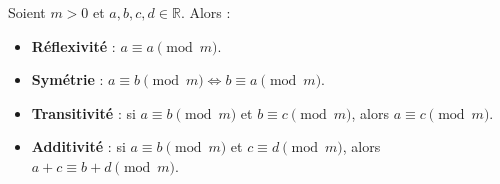 \renewcommand{\arraystretch}{1}

\columnbreak
\begin{f}
	
	Soient \(m > 0\) et \(a, b, c, d \in \mathbb{R}\). Alors :
	
	\begin{itemize}
		\item \textbf{Réflexivité} : \(a \equiv a \pmod{m}\).
		\item \textbf{Symétrie} : \(a \equiv b \pmod{m} \iff b \equiv a \pmod{m}\).
		\item \textbf{Transitivité} : si \(a \equiv b \pmod{m}\) et \(b \equiv c \pmod{m}\), alors \(a \equiv c \pmod{m}\).
		\item \textbf{Additivité} : si \(a \equiv b \pmod{m}\) et \(c \equiv d \pmod{m}\), alors \(a + c \equiv b + d \pmod{m}\).
	\end{itemize}
	
\end{f}	

